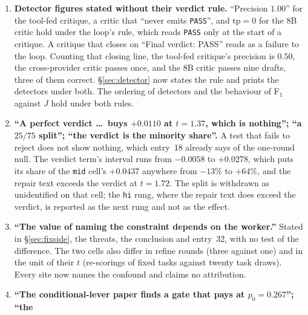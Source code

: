 \documentclass[11pt]{article}
\begin{document}
\begin{enumerate}
    verdict, so the loop rewrote every draft against a truncated reasoning trace. It measured no
    detector and supports no statement about critics from another lineage. The second worker's
    section now reports it as a failed measurement, its figure drops it, and the count of
    substituted critics that moved nothing falls to one on that worker. Its numbers are unchanged
    and stay printed, labelled for what they measure. The cell joins the defects reported in
    Paper~III in kind: a measurement that ran and measured nothing, read as a result because no
    check opened the text it scored.
  \item \textbf{Detector figures stated without their verdict rule.} ``Precision $1.00$'' for the
    tool-fed critique, a critic that ``never emits \texttt{PASS}'', and $\mathrm{tp}=0$ for the
    8B critic hold under the loop's rule, which reads \texttt{PASS} only at the start of a
    critique. A critique that closes on ``Final verdict: PASS'' reads as a failure to the loop.
    Counting that closing line, the tool-fed critique's precision is $0.50$, the cross-provider
    critic passes once, and the 8B critic passes nine drafts, three of them correct.
    \S\ref{sec:detector} now states the rule and prints the detectors under both. The ordering of
    detectors and the behaviour of F$_1$ against $J$ hold under both rules.
  \item \textbf{``A perfect verdict \ldots\ buys $+0.0110$ at $t = 1.37$, which is nothing''; ``a
    $25/75$ split''; ``the verdict is the minority share''.} A test that fails to reject does not
    show nothing, which entry~18 already says of the one-round null. The verdict term's interval
    runs from $-0.0058$ to $+0.0278$, which puts its share of the \texttt{mid} cell's $+0.0437$
    anywhere from $-13\%$ to $+64\%$, and the repair text exceeds the verdict at $t = 1.72$.
    The split is withdrawn as unidentified on that cell; the \texttt{hi} rung, where the repair
    text does exceed the verdict, is reported as the next rung and not as the effect.
  \item \textbf{``The value of naming the constraint depends on the worker.''} Stated in
    \S\ref{sec:fixside}, the threats, the conclusion and entry~32, with no test of the
    difference. The two cells also differ in refine rounds (three against
    one) and in the unit of their $t$ (re-scorings of fixed tasks against twenty task draws).
    Every site now names the confound and claims no attribution.
  \item \textbf{``The conditional-lever paper finds a gate that pays at $p_0 = 0.267$''; ``the
}
\end{enumerate}
\end{document}
